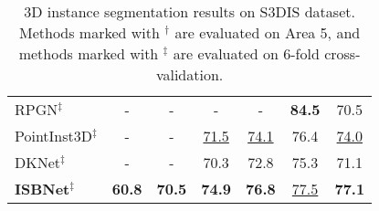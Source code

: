 \documentclass[10pt,twocolumn,letterpaper]{article}
\def\Approach{ISBNet}
\begin{document}
\begin{table}
\begin{tabular}{lcccccc}
RPGN$^{\ddagger}$ \cite{dong2022rpgn} & - & - & - & - & \textbf{84.5} & 70.5 \\
PointInst3D$^{\ddagger}$ \cite{He2022PointInst3DS3} & - & - & \underline{71.5} & \underline{74.1} & 76.4 & \underline{74.0} \\
DKNet$^{\ddagger}$ \cite{wu2022dknet} & - & - & 70.3 & 72.8 & 75.3 & 71.1 \\
\midrule
\textbf{\Approach}$^{\ddagger}$ & \textbf{60.8} & \textbf{70.5} & \textbf{74.9} & \textbf{76.8} & \underline{77.5} & \textbf{77.1} \\
\bottomrule
\end{tabular}
\vspace{-4pt}
\caption{3D instance segmentation results on S3DIS dataset. Methods marked with $^{\dagger}$ are evaluated on Area 5, and methods marked with $^{\ddagger}$ are evaluated on 6-fold cross-validation.}
\label{tab:s3dis}
\vspace{-7pt}
\end{table}
\end{document}
